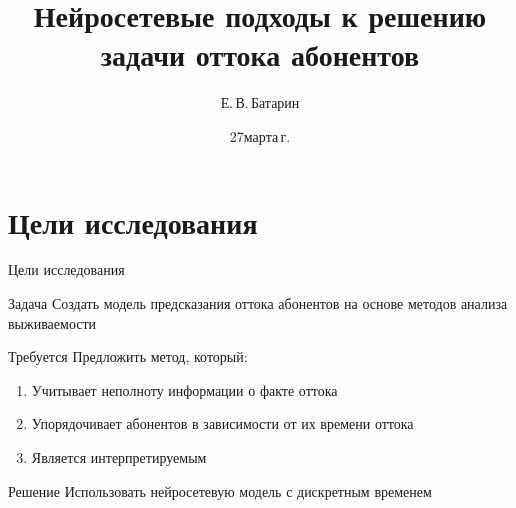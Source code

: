 \documentclass[10pt,pdf,hyperref={unicode}]{beamer}
\title[Нейросетевые подходы к решению задачи оттока абонентов]{Нейросетевые подходы к решению задачи оттока абонентов}
\author{Е.\,В.\,Батарин}
\institute[]{Московский физико-технический институт}
\date[2022]{\small 27\;марта\;2025\,г.}
\begin{document}
\begin{frame}
\titlepage
\end{frame}

\section{Цели исследования}
\begin{frame}{Цели исследования}
\bigskip

\begin{block}{Задача}
Создать модель предсказания оттока абонентов на основе методов анализа выживаемости
\end{block}
\begin{block}{Требуется}
Предложить метод, который: 
\justifying
\begin{enumerate}[1)]
\item Учитывает неполноту информации о факте оттока
\item Упорядочивает абонентов в зависимости от их времени оттока
\item Является интерпретируемым
\end{enumerate}
\end{block}
\begin{block}{Решение}
Использовать нейросетевую модель с дискретным временем
\end{block}
\end{frame}

\end{document}
